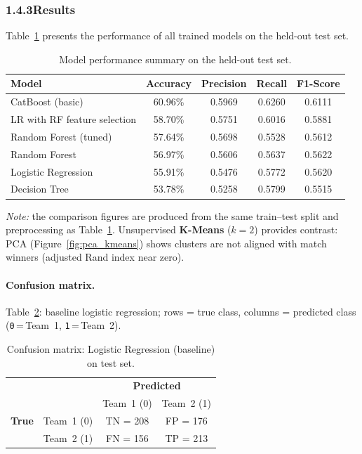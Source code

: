 \documentclass[12pt,a4paper]{article}
\begin{document}
\subsubsection{1.4.3\quad Results}

Table~\ref{tab:results} presents the performance of all trained models on the held-out test set.

\begin{table}[H]
\centering
\caption{Model performance summary on the held-out test set.}
\label{tab:results}
\begin{tabular}{lcccc}
\toprule
\textbf{Model} & \textbf{Accuracy} & \textbf{Precision} & \textbf{Recall} & \textbf{F1-Score} \\
\midrule
CatBoost (basic)              & 60.96\%  & 0.5969 & 0.6260 & 0.6111 \\
LR with RF feature selection  & 58.70\%  & 0.5751 & 0.6016 & 0.5881 \\
Random Forest (tuned)         & 57.64\%  & 0.5698 & 0.5528 & 0.5612 \\
Random Forest                 & 56.97\%  & 0.5606 & 0.5637 & 0.5622 \\
Logistic Regression           & 55.91\%  & 0.5476 & 0.5772 & 0.5620 \\
Decision Tree                 & 53.78\%  & 0.5258 & 0.5799 & 0.5515 \\
\bottomrule
\end{tabular}
\end{table}

\noindent\textit{Note:} the comparison figures are produced from the same train--test split and preprocessing as Table~\ref{tab:results}. Unsupervised \textbf{K-Means} ($k{=}2$) provides contrast: PCA (Figure~\ref{fig:pca_kmeans}) shows clusters are not aligned with match winners (adjusted Rand index near zero).

\paragraph{Confusion matrix.}
Table~\ref{tab:cm_lr}: baseline logistic regression; rows = true class, columns = predicted class (\texttt{0}\,=\,Team~1, \texttt{1}\,=\,Team~2).

\begin{table}[H]
\centering
\caption{Confusion matrix: Logistic Regression (baseline) on test set.}
\label{tab:cm_lr}
\begin{tabular}{cc|cc}
 & & \multicolumn{2}{c}{\textbf{Predicted}} \\
 & & Team~1 (0) & Team~2 (1) \\
\hline
\textbf{True} & Team~1 (0) & TN = 208 & FP = 176 \\
 & Team~2 (1) & FN = 156 & TP = 213 \\
\end{tabular}
\end{table}
\end{document}
